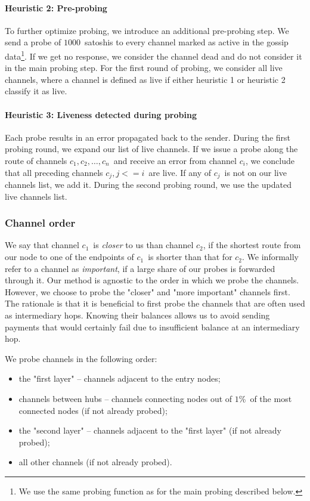 \paragraph{Heuristic 2: Pre-probing}
To further optimize probing, we introduce an additional pre-probing step.
We send a probe of $1000$~satoshis to every channel marked as active in the gossip data\footnote{We use the same probing function as for the main probing described below.}.
If we get no response, we consider the channel dead and do not consider it in the main probing step.
For the first round of probing, we consider all live channels, where a channel is defined as live if either heuristic 1 or heuristic 2 classify it as live.

\paragraph{Heuristic 3: Liveness detected during probing}
Each probe results in an error propagated back to the sender.
During the first probing round, we expand our list of live channels.
If we issue a probe along the route of channels $c_1, c_2, \dots, c_n$~and receive an error from channel $c_i$, we conclude that all preceding channels $c_j, j<=i$~are live.
If any of $c_j$~is not on our live channels list, we add it.
During the second probing round, we use the updated live channels list.


\subsubsection*{Channel order}
We say that channel $c_1$~is \textit{closer} to us than channel $c_2$, if the shortest route from our node to one of the endpoints of $c_1$~is shorter than that for $c_2$.
We informally refer to a channel as \textit{important}, if a large share of our probes is forwarded through it.
Our method is agnostic to the order in which we probe the channels.
However, we choose to probe the "closer" and "more important" channels first.
The rationale is that it is beneficial to first probe the channels that are often used as intermediary hops.
Knowing their balances allows us to avoid sending payments that would certainly fail due to insufficient balance at an intermediary hop.

We probe channels in the following order:

\begin{itemize}
	\item the "first layer" -- channels adjacent to the entry nodes;
	\item channels between hubs -- channels connecting nodes out of $1$\%~of the most connected nodes (if not already probed);
	\item the "second layer" -- channels adjacent to the "first layer" (if not already probed);
	\item all other channels (if not already probed).
\end{itemize}


